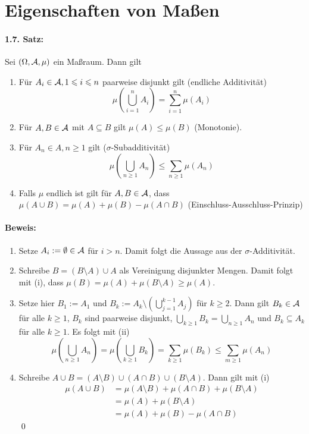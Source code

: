 \documentclass[12pt]{report}
\begin{document}
\section*{Eigenschaften von Ma\ss{}en}

\paragraph{1.7. Satz:} Sei $(\Omega,\mathcal{A},\mu)$ ein Ma\ss{}raum. Dann gilt
\begin{enumerate}[label=(\roman*)]
    \item F\"ur $A_i\in\mathcal{A},1\leqslant i\leqslant n$ paarweise disjunkt gilt (endliche Additivit\"at)
    $$\mu\left(\bigcup_{i=1}^nA_i\right)=\sum_{i=1}^n\mu(A_i)$$
    \item F\"ur $A,B\in\mathcal{A}$ mit $A\subseteq B$ gilt $\mu(A)\leq\mu(B)$ (Monotonie). 
    \item F\"ur $A_n\in A,n\geq1$ gilt ($\sigma$-Subadditivit\"at)
    $$\mu\left(\bigcup_{n\geq1}A_n\right)\leq\sum_{n\geq1}\mu(A_n)$$
    \item Falls $\mu$ endlich ist gilt f\"ur $A,B\in\mathcal{A}$, dass $\mu(A\cup B)=\mu(A)+\mu(B)-\mu(A\cap B)$ (Einschluss-Ausschluss-Prinzip)
\end{enumerate}

\paragraph{Beweis:}
\begin{enumerate}[label=(\roman*)]
    \item Setze $A_i:=\emptyset\in\mathcal{A}$ f\"ur $i>n$. Damit folgt die Aussage aus der $\sigma$-Additivit\"at.
    \item Schreibe $B=(B\setminus A)\cup A$ als Vereinigung disjunkter Mengen. Damit folgt mit (i), dass $\mu(B)=\mu(A)+\mu(B\setminus A)\geq\mu(A)$.
    \item Setze hier $B_1:=A_1$ und $B_k:=A_k\setminus\left(\bigcup_{j=1}^{k-1}A_j\right)$ f\"ur $k\geq2$. Dann gilt $B_k\in\mathcal{A}$ f\"ur alle $k\geq1$, $B_k$ sind paarweise disjunkt, $\bigcup_{k\geq1}B_k=\bigcup_{n\geq1}A_n$ und $B_k\subseteq A_k$ f\"ur alle $k\geq1$. Es folgt mit (ii)
    $$\mu\left(\bigcup_{n\geq1}A_n\right)=\mu\left(\bigcup_{k\geq1}B_k\right)=\sum_{k\geq1}\mu(B_k)\leq\sum_{m\geq1}\mu(A_n)$$
    \item Schreibe $A\cup B=(A\setminus B)\cup(A\cap B)\cup(B\setminus A)$. Dann gilt mit (i)
    \begin{align*}
        \mu(A\cup B)&=\mu(A\setminus B)+\mu(A\cap B)+\mu(B\setminus A)\\
        &=\mu(A)+\mu(B\setminus A)\\
        &=\mu(A)+\mu(B)-\mu(A\cap B)
    \end{align*}
    \qed
\end{enumerate}
\end{document}
